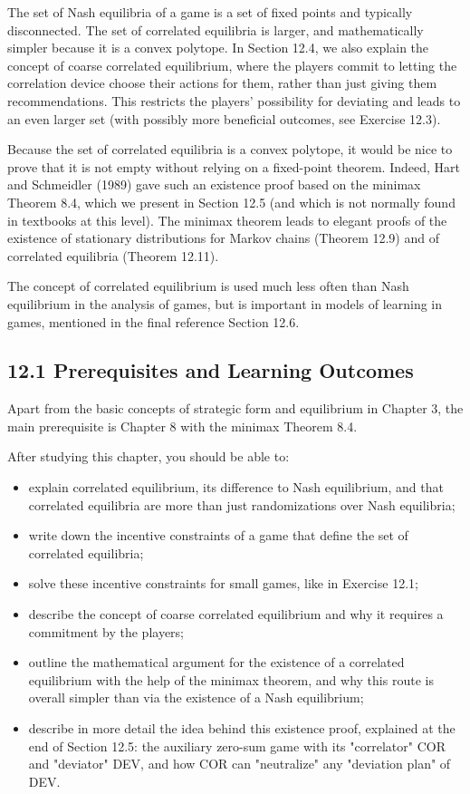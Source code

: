 \documentclass[12pt]{article}
\begin{document}
The set of Nash equilibria of a game is a set of fixed points and typically disconnected. The set of correlated equilibria is larger, and mathematically simpler because it is a convex polytope. In Section 12.4, we also explain the concept of coarse correlated equilibrium, where the players commit to letting the correlation device choose their actions for them, rather than just giving them recommendations. This restricts the players' possibility for deviating and leads to an even larger set (with possibly more beneficial outcomes, see Exercise 12.3).

Because the set of correlated equilibria is a convex polytope, it would be nice to prove that it is not empty without relying on a fixed-point theorem. Indeed, Hart and Schmeidler (1989) gave such an existence proof based on the minimax Theorem 8.4, which we present in Section 12.5 (and which is not normally found in textbooks at this level). The minimax theorem leads to elegant proofs of the existence of stationary distributions for Markov chains (Theorem 12.9) and of correlated equilibria (Theorem 12.11).

The concept of correlated equilibrium is used much less often than Nash equilibrium in the analysis of games, but is important in models of learning in games, mentioned in the final reference Section 12.6.

\subsection*{12.1 Prerequisites and Learning Outcomes}
Apart from the basic concepts of strategic form and equilibrium in Chapter 3, the main prerequisite is Chapter 8 with the minimax Theorem 8.4.

After studying this chapter, you should be able to:

\begin{itemize}
  \item explain correlated equilibrium, its difference to Nash equilibrium, and that correlated equilibria are more than just randomizations over Nash equilibria;
  \item write down the incentive constraints of a game that define the set of correlated equilibria;
  \item solve these incentive constraints for small games, like in Exercise 12.1;
  \item describe the concept of coarse correlated equilibrium and why it requires a commitment by the players;
  \item outline the mathematical argument for the existence of a correlated equilibrium with the help of the minimax theorem, and why this route is overall simpler than via the existence of a Nash equilibrium;
  \item describe in more detail the idea behind this existence proof, explained at the end of Section 12.5: the auxiliary zero-sum game with its "correlator" COR and "deviator" DEV, and how COR can "neutralize" any "deviation plan" of DEV.
\end{itemize}
\end{document}
